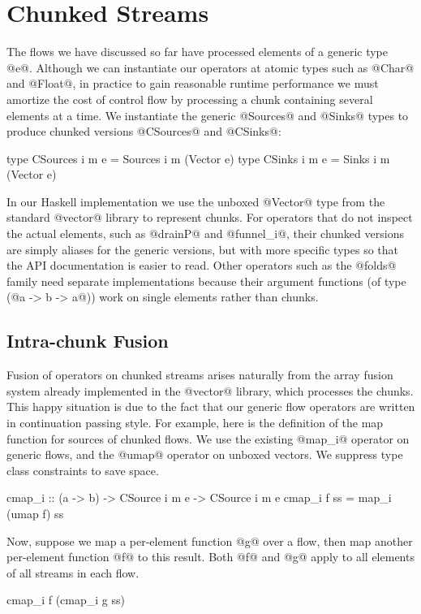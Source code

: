 \section{Chunked Streams}
\label{s:Chunked}
The flows we have discussed so far have processed elements of a generic type @e@. Although we can instantiate our operators at atomic types such as @Char@ and @Float@, in practice to gain reasonable runtime performance we must amortize the cost of control flow by processing a chunk containing several elements at a time. We instantiate the generic @Sources@ and @Sinks@ types to produce chunked versions @CSources@ and @CSinks@:
\begin{code}
   type CSources i m e = Sources i m (Vector e)
   type CSinks   i m e = Sinks   i m (Vector e)
\end{code}

In our Haskell implementation we use the unboxed @Vector@ type from the standard @vector@ library to represent chunks. For operators that do not inspect the actual elements, such as @drainP@ and @funnel_i@, their chunked versions are simply aliases for the generic versions, but with more specific types so that the API documentation is easier to read. Other operators such as the @folds@ family need separate implementations because their argument functions (of type (@a -> b -> a@)) work on single elements rather than chunks. 


\subsection{Intra-chunk Fusion}
\label{s:IntraChunk}
Fusion of operators on chunked streams arises naturally from the array fusion system already implemented in the @vector@ library, which processes the chunks. This happy situation is due to the fact that our generic flow operators are written in continuation passing style. For example, here is the definition of the map function for sources of chunked flows. We use the existing @map_i@ operator on generic flows, and the @umap@ operator on unboxed vectors. We suppress type class constraints to save space.
\begin{code}
   cmap_i :: (a -> b) 
          -> CSource i m e -> CSource i m e
   cmap_i f ss = map_i (umap f) ss
\end{code}

Now, suppose we map a per-element function @g@ over a flow, then map another per-element function @f@ to this result. Both @f@ and @g@ apply to all elements of all streams in each flow.
\begin{code}
   cmap_i f (cmap_i g ss)
\end{code}

